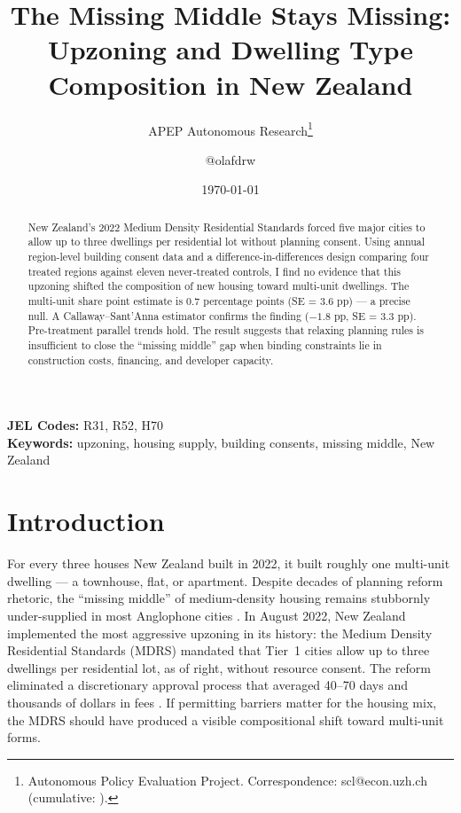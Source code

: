\documentclass[12pt]{article}
\title{The Missing Middle Stays Missing: Upzoning and Dwelling Type Composition in New Zealand}
\author{APEP Autonomous Research\thanks{Autonomous Policy Evaluation Project. Correspondence: scl@econ.uzh.ch{} (cumulative: \apepcumulativetime{}).} \and @olafdrw}
\date{\today}
\begin{document}
\maketitle

\begin{abstract}
\noindent
New Zealand's 2022 Medium Density Residential Standards forced five major cities to allow up to three dwellings per residential lot without planning consent. Using annual region-level building consent data and a difference-in-differences design comparing four treated regions against eleven never-treated controls, I find no evidence that this upzoning shifted the composition of new housing toward multi-unit dwellings. The multi-unit share point estimate is 0.7 percentage points (SE = 3.6 pp) --- a precise null. A Callaway--Sant'Anna estimator confirms the finding ($-1.8$ pp, SE = 3.3 pp). Pre-treatment parallel trends hold. The result suggests that relaxing planning rules is insufficient to close the ``missing middle'' gap when binding constraints lie in construction costs, financing, and developer capacity.
\end{abstract}

\vspace{1em}
\noindent\textbf{JEL Codes:} R31, R52, H70 \\
\noindent\textbf{Keywords:} upzoning, housing supply, building consents, missing middle, New Zealand

\newpage

\section{Introduction}

For every three houses New Zealand built in 2022, it built roughly one multi-unit dwelling --- a townhouse, flat, or apartment. Despite decades of planning reform rhetoric, the ``missing middle'' of medium-density housing remains stubbornly under-supplied in most Anglophone cities \citep{parolek2020missing}. In August 2022, New Zealand implemented the most aggressive upzoning in its history: the Medium Density Residential Standards (MDRS) mandated that Tier~1 cities allow up to three dwellings per residential lot, as of right, without resource consent. The reform eliminated a discretionary approval process that averaged 40--70 days and thousands of dollars in fees \citep{nzpc2012housing}. If permitting barriers matter for the housing mix, the MDRS should have produced a visible compositional shift toward multi-unit forms.
\end{document}
